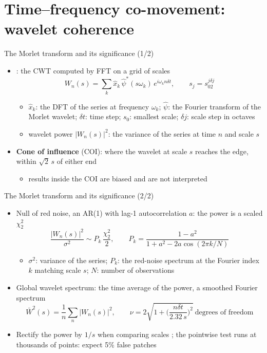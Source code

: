 \section{Time--frequency co-movement: wavelet coherence}

\begin{frame}{The Morlet transform and its significance (1/2)}
\itemsize{\small}
\begin{itemize}
    \item {}: the CWT computed by FFT on a grid of scales
    \[ W_n(s) = \sum_k\hat x_k\,\hat\psi^*(s\omega_k)\,e^{i\omega_kn\delta t}, \qquad s_j = s_02^{j\delta j} \]
    \begin{itemize}
        \item $\hat x_k$: the DFT of the series at frequency $\omega_k$; $\hat\psi$: the Fourier transform of the Morlet wavelet; $\delta t$: time step; $s_0$: smallest scale; $\delta j$: scale step in octaves
        \item wavelet power $|W_n(s)|^2$: the variance of the series at time $n$ and scale $s$
    \end{itemize}
    \item \textbf{Cone of influence} (COI): where the wavelet at scale $s$ reaches the edge, within $\sqrt2\,s$ of either end
    \begin{itemize}
        \item results inside the COI are biased and are not interpreted
    \end{itemize}
\end{itemize}
\end{frame}

\begin{frame}{The Morlet transform and its significance (2/2)}
\itemsize{\small}
\begin{itemize}
    \item Null of red noise, an AR(1) with lag-1 autocorrelation $a$: the power is a scaled $\chi^2_2$
    \[ \frac{|W_n(s)|^2}{\sigma^2} \sim P_k\,\frac{\chi^2_2}{2}, \qquad P_k = \frac{1 - a^2}{1 + a^2 - 2a\cos(2\pi k/N)} \]
    \begin{itemize}
        \item $\sigma^2$: variance of the series; $P_k$: the red-noise spectrum at the Fourier index $k$ matching scale $s$; $N$: number of observations
    \end{itemize}
    \item Global wavelet spectrum: the time average of the power, a smoothed Fourier spectrum
    \[ \bar W^2(s) = \frac1n\sum_n|W_n(s)|^2, \qquad \nu = 2\sqrt{1 + \Big(\frac{n\delta t}{2.32\,s}\Big)^2} \ \text{degrees of freedom} \]
    \item Rectify the power by $1/s$ when comparing scales ; the pointwise test runs at thousands of points: expect 5\% false patches 
\end{itemize}
\end{frame}

